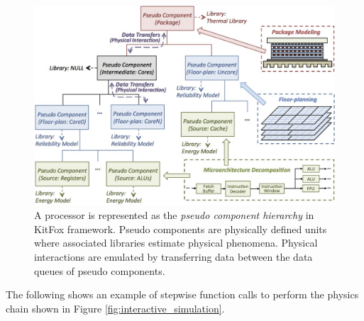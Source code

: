 \begin{figure}[h]
\centering
\includegraphics[width=0.6 \textwidth]{figures/kitfox_hierarchy.jpg}
\caption{A processor is represented as the \emph{pseudo component hierarchy} in KitFox framework. Pseudo components are physically defined units where associated libraries estimate physical phenomena. Physical interactions are emulated by transferring data between the data queues of pseudo components.}
\label{fig:kitfox_hierarchy}
\end{figure}

\noindent
The following shows an example of stepwise function calls to perform the physics chain shown in Figure \ref{fig:interactive_simulation}.

